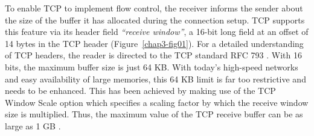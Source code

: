 \begin{multicols}{2}
To enable TCP to implement flow control, the receiver informs the sender about the size of the buffer it has allocated during the connection setup. TCP supports this feature via its header field \textit{“receive window”}, a 16-bit long field at an offset of 14 bytes in the TCP header (Figure~\ref{chap3-fig01}). For a detailed understanding of TCP headers, the reader is directed to the TCP standard RFC 793 \cite{art3-key01}. With 16 bits, the maximum buffer size is just 64 KB. With today’s high-speed networks and easy availability of large memories, this 64 KB limit is far too restrictive and needs to be enhanced. This has been achieved by making use of the TCP Window Scale option \cite{art3-key02}\cite{art3-key03} which specifies a scaling factor by which the receive window size is multiplied. Thus, the maximum value of the TCP receive buffer can be as large as 1 GB \cite{art3-key02}\cite{art3-key03}.


\end{multicols}

